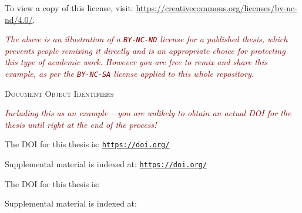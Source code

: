 To view a copy of this license, visit: \url{https://creativecommons.org/licenses/by-nc-nd/4.0/}.

\vspace{1em}

\textcolor{darkred}{\textit{\footnotesize The above is an illustration of a \texttt{BY-NC-ND} license for a published thesis, which prevents people remixing it directly and is an appropriate choice for protecting this type of academic work.  However you are free to remix and share this \textit{example}, as per the \texttt{BY-NC-SA} license applied to this whole repository.}}


\par \vspace{8em}


{\LARGE\textsc{Document Object Identifiers}}
\label{sec:thesis-doi}

\par \vspace{0.5em}

\textcolor{darkred}{\textit{\footnotesize Including this as an example -- you are unlikely to obtain an actual DOI for the thesis until right at the end of the process!}}

\ifprintversion

	The DOI for this thesis is: {\large \href{https://doi.org/\doiExampleDocument}{\textcolor{hyperdarkergray}{\texttt{https://doi.org/\doiExampleDocument}}}}%

	Supplemental material is indexed at: {\large \href{https://doi.org/\doiIndex}{\textcolor{hyperdarkergray}{\texttt{https://doi.org/\doiIndex}}}}%
	
\else

	The DOI for this thesis is: {\large {}}
	
	Supplemental material is indexed at: {\large {}}

\fi



